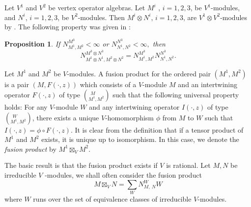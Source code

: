 \documentclass{article}
\newtheorem{proposition}[lemma]{Proposition}
\begin{document}
	
	
	Let $V^{1}$ and $V^{2}$ be vertex operator algebras. Let $M^{i}$
	, $i=1,2,3$, be $V^{1}$-modules, and $N^{i}$, $i=1,2,3$, be $V^{2}$-modules.
	Then $M^{i}\otimes N^{i}$, $i=1,2,3$, are $V^{1}\otimes V^{2}$-modules
	by \cite{FHL}. The following property was given in \cite{ADL}:
	
	\begin{proposition} \label{fusion of tensor product}If $N_{M^{1},M^{2}}^{M^{3}}<\infty$
		or $N_{N^{1},N^{2}}^{N^{3}}<\infty,$ then
		\[
		N_{M^{1}\otimes N^{1},M^{2}\otimes N^{2}}^{M^{3}\otimes N^{3}}=N_{M^{1},M^{2}}^{M^{3}}N_{N^{1},N^{2}}^{N^{3}}.
		\]
	\end{proposition}
	
	Let $M^{1}$ and $M^{2}$ be $V$-modules. A fusion product for the
	ordered pair $\left(M^{1},M^{2}\right)$ is a pair $\left(M,F\left(\cdot,z\right)\right)$
	which consists of a $V$-module $M$ and an intertwining operator
	$F\left(\cdot,z\right)$ of type $\left(_{M^{1},M^{2}}^{\ \ M}\right)$
	such that the following universal property holds: For any $V$-module
	$W$ and any intertwining operator $I\left(\cdot,z\right)$ of type
	$\left(_{M^{1},M^{2}}^{\ \ W}\right)$, there exists a unique $V$-homomorphism
	$\phi$ from $M$ to $W$ such that $I\left(\cdot,z\right)=\phi\circ F\left(\cdot,z\right).$
	It is clear from the definition that if a tensor product of $M^{1}$
	and $M^{2}$ exists, it is unique up to isomorphism. In this case,
	we denote the \emph{fusion product} by $M^{1}\boxtimes_{V}M^{2}.$
	
	The basic result is that the fusion product exists if $V$ is rational.
	Let $M,N$ be irreducible $V$ -modules, we shall often consider the
	fusion product
	\[
	M\boxtimes_{V}N=\sum_{W}N_{M,\ N}^{W}W
	\]
	where $W$ runs over the set of equivalence classes of irreducible
	$V$-modules.
	
\end{document}
